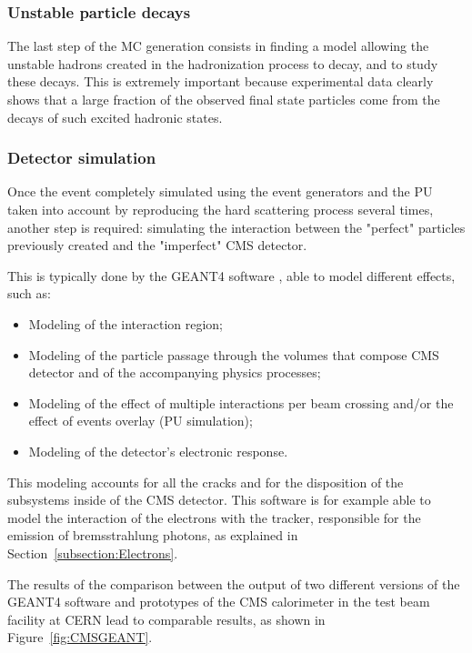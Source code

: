\documentclass[a4paper, 10pt, openright]{report}
\begin{document}
\subsubsection*{Unstable particle decays}

The last step of the \ac{MC} generation consists in finding a model allowing the unstable hadrons created in the hadronization process to decay, and to study these decays. This is extremely important because experimental data clearly shows that a large fraction of the observed final state particles come from the decays of such excited hadronic states.

\subsubsection*{Detector simulation}

Once the event completely simulated using the event generators and the \ac{PU} taken into account by reproducing the hard scattering process several times, another step is required: simulating the interaction between the "perfect" particles previously created and the "imperfect" \ac{CMS} detector. 

This is typically done by the GEANT4 software \cite{Geant4}, able to model different effects, such as:

\begin{itemize}
\item Modeling of the interaction region;
\item Modeling of the particle passage through the volumes that compose CMS detector and of the accompanying physics processes;
\item Modeling of the effect of multiple interactions per beam crossing and/or the effect of events overlay (\ac{PU} simulation);
\item Modeling of the detector's electronic response.
\end{itemize}

This modeling accounts for all the cracks and for the disposition of the subsystems inside of the \ac{CMS} detector. This software is for example able to model the interaction of the electrons with the tracker, responsible for the emission of bremsstrahlung photons, as explained in Section~\ref{subsection:Electrons}.

The results of the comparison between the output of two different versions of the GEANT4 software and prototypes of the CMS calorimeter in the test beam facility at \ac{CERN} lead to comparable results, as shown in Figure~\ref{fig:CMSGEANT}.
\end{document}
